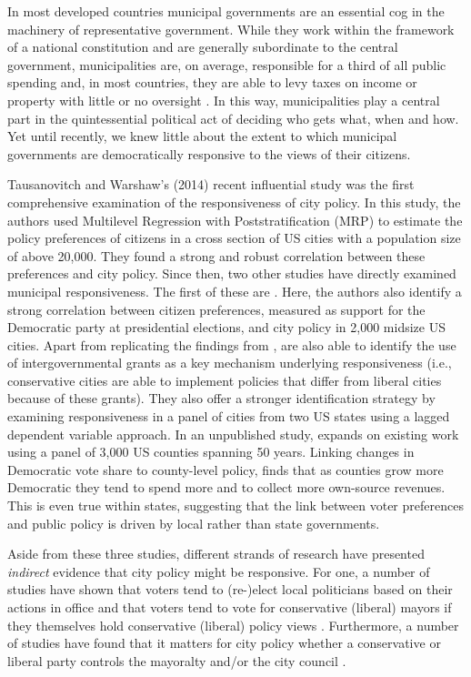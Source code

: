 \documentclass[a4paper,12pt]{article}
\begin{document}
In most developed countries municipal governments are an essential cog in the machinery of representative government. While they work within the framework of a national constitution and are generally subordinate to the central government, municipalities are, on average, responsible for a third of all public spending and, in most countries, they are able to levy taxes on income or property with little or no oversight \citep{oecd2016subnational}. In this way, municipalities play a central part in the quintessential political act of deciding who gets what, when and how.  Yet until recently, we knew little about the extent to which municipal governments are democratically responsive to the views of their citizens.


Tausanovitch and Warshaw's (2014) recent influential study  was the first comprehensive examination of the responsiveness of city policy. In this study, the authors used Multilevel Regression with Poststratification (MRP) to estimate the policy preferences of citizens in a cross section of US cities with a population size of above 20,000. They found a strong and robust correlation between these preferences and city policy. Since then, two other studies have directly examined municipal responsiveness. The first of these are \cite{einstein2016pushing}. Here, the authors also identify a strong correlation between citizen preferences, measured as support for the Democratic party at presidential elections,  and city policy in 2,000 midsize US cities. Apart from replicating the findings from \citeauthor{tausanovitch2014representation}, \citeauthor{einstein2016pushing} are also able to identify the use of intergovernmental grants as a key mechanism underlying responsiveness (i.e., conservative cities are able to implement policies that differ from liberal cities because of these grants). They also offer a stronger identification strategy by examining responsiveness in a panel of cities from two US states using a lagged dependent variable approach. In an unpublished study, \cite{sances2017voters} expands on existing work using a panel of 3,000 US counties spanning 50 years. Linking changes in Democratic vote share to county-level policy, \citeauthor{sances2017voters} finds that as counties grow more Democratic they tend to spend more and to collect more own-source revenues. This is even true within states, suggesting that the link between voter preferences and public policy is driven by local rather than state governments.

Aside from these three studies, different strands of research have presented \textit{indirect} evidence that city policy might be responsive. For one, a number of studies have shown that voters tend to (re-)elect local politicians based on their actions in office \citep{arnold2012holding,burnett2017politics} and that voters tend to vote for conservative (liberal)  mayors if they themselves hold conservative (liberal) policy views  \citep{sances2017ideology,boudreau2015lost,hopkins2017retrospective}. Furthermore, a number of studies have found that it matters for city policy whether a conservative or liberal party controls the mayoralty and/or the city council \citep{fiva2016power,folke2014shades,blom2006parties,de2016mayoral}. 
\end{document}
